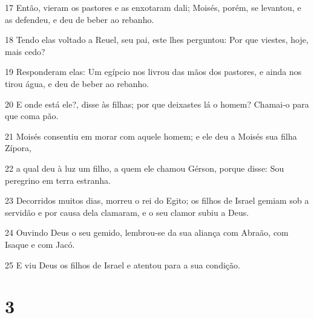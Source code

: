\par 17 Então, vieram os pastores e as enxotaram dali; Moisés, porém, se levantou, e as defendeu, e deu de beber ao rebanho.
\par 18 Tendo elas voltado a Reuel, seu pai, este lhes perguntou: Por que viestes, hoje, mais cedo?
\par 19 Responderam elas: Um egípcio nos livrou das mãos dos pastores, e ainda nos tirou água, e deu de beber ao rebanho.
\par 20 E onde está ele?, disse às filhas; por que deixastes lá o homem? Chamai-o para que coma pão.
\par 21 Moisés consentiu em morar com aquele homem; e ele deu a Moisés sua filha Zípora,
\par 22 a qual deu à luz um filho, a quem ele chamou Gérson, porque disse: Sou peregrino em terra estranha.
\par 23 Decorridos muitos dias, morreu o rei do Egito; os filhos de Israel gemiam sob a servidão e por causa dela clamaram, e o seu clamor subiu a Deus.
\par 24 Ouvindo Deus o seu gemido, lembrou-se da sua aliança com Abraão, com Isaque e com Jacó.
\par 25 E viu Deus os filhos de Israel e atentou para a sua condição.

\chapter{3}

